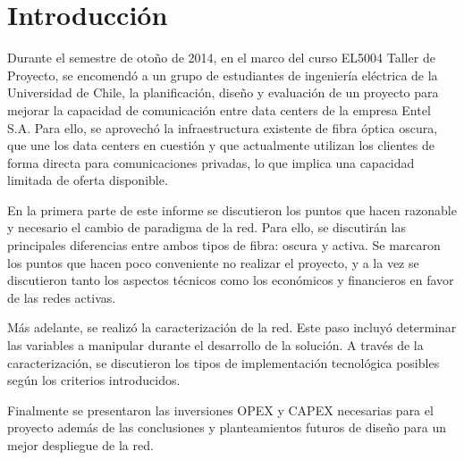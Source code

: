 \section{Introducción}
\label{sec:intro}

Durante el semestre de otoño de 2014, en el marco del curso EL5004
Taller de Proyecto, se encomendó a un grupo de estudiantes de
ingeniería eléctrica de la Universidad de Chile, la planificación,
diseño y evaluación de un proyecto para mejorar la capacidad de
comunicación entre data centers de la empresa Entel S.A. Para ello,
se aprovechó la infraestructura existente de fibra óptica oscura,
que une los data centers en cuestión y que actualmente utilizan los
clientes de forma directa para comunicaciones privadas, lo que implica
una capacidad limitada de oferta disponible.

En la primera parte de este informe se discutieron los puntos que
hacen razonable y necesario el cambio de paradigma de la red. Para
ello, se discutirán las principales diferencias entre ambos tipos de
fibra: oscura y activa. Se marcaron los puntos que hacen poco
conveniente no realizar el proyecto, y a la vez se discutieron tanto
los aspectos técnicos como los económicos y financieros en favor de
las redes activas.

Más adelante, se realizó la caracterización de la red. Este paso
incluyó determinar las variables a manipular durante el desarrollo de
la solución. A través de la caracterización, se discutieron los tipos
de implementación tecnológica posibles según los criterios
introducidos.

Finalmente se presentaron las inversiones OPEX y CAPEX necesarias
para el proyecto además de las conclusiones y planteamientos futuros
de diseño para un mejor despliegue de la red.
